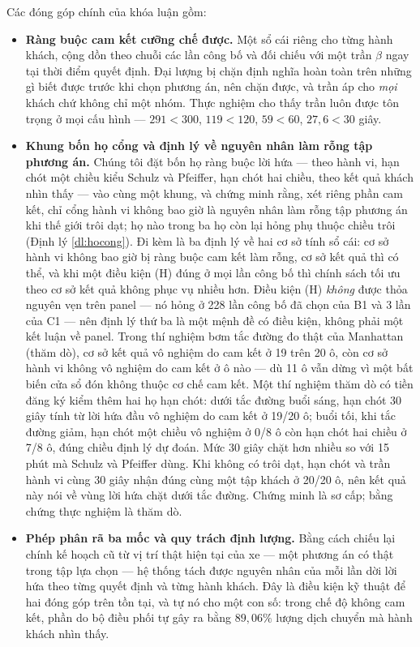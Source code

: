 Các đóng góp chính của khóa luận gồm:

\begin{itemize}[leftmargin=1.2cm,itemsep=3pt,topsep=4pt]
\item \textbf{Ràng buộc cam kết cưỡng chế được.} Một sổ cái riêng cho từng hành khách, cộng dồn
theo chuỗi các lần công bố và đối chiếu với một trần $\beta$ ngay tại thời điểm quyết định.
Đại lượng bị chặn định nghĩa hoàn toàn trên những gì biết được trước khi chọn phương án, nên chặn
được, và trần áp cho \emph{mọi} khách chứ không chỉ một nhóm. Thực nghiệm cho thấy trần luôn được
tôn trọng ở mọi cấu hình --- $291 < 300$, $119 < 120$, $59 < 60$, $27{,}6 < 30$ giây.

\item \textbf{Khung bốn họ cổng và định lý về nguyên nhân làm rỗng tập phương án.} Chúng tôi đặt
bốn họ ràng buộc lời hứa --- theo hành vi, hạn chót một chiều kiểu Schulz và Pfeiffer, hạn chót
hai chiều, theo kết quả khách nhìn thấy --- vào cùng một khung, và chứng minh rằng, xét riêng phần
cam kết, chỉ cổng hành vi không bao giờ là nguyên nhân làm rỗng tập phương án khi thế giới trôi
dạt; họ nào trong ba họ còn lại hỏng phụ thuộc chiều trôi (Định lý \ref{dl:hocong}). Đi kèm là ba
định lý về hai cơ sở tính sổ cái: cơ sở hành vi không bao giờ bị ràng buộc cam kết làm rỗng, cơ sở
kết quả thì có thể, và khi một điều kiện (H) đúng ở mọi lần công bố thì chính sách tối ưu theo cơ
sở kết quả không phục vụ nhiều hơn. Điều kiện (H) \emph{không} được thỏa nguyên vẹn trên panel ---
nó hỏng ở 228 lần công bố đã chọn của B1 và 3 lần của C1 --- nên định lý thứ ba là một mệnh đề có
điều kiện, không phải một kết luận về panel. Trong thí nghiệm bơm tắc đường đo thật của
Manhattan (thăm dò), cơ sở kết quả vô nghiệm do cam kết ở 19 trên 20 ô, còn cơ sở hành vi không
vô nghiệm do cam kết ở ô nào --- dù 11 ô vẫn dừng vì một bất biến cửa sổ đón không thuộc cơ chế cam
kết. Một thí nghiệm thăm dò có tiền đăng ký kiểm thêm hai họ hạn chót: dưới tắc đường buổi sáng, hạn
chót 30 giây tính từ lời hứa đầu vô nghiệm do cam kết ở 19/20 ô; buổi tối, khi tắc đường giảm, hạn
chót một chiều vô nghiệm ở 0/8 ô còn hạn chót hai chiều ở 7/8 ô, đúng chiều định lý dự đoán. Mức 30
giây chặt hơn nhiều so với 15 phút mà Schulz và Pfeiffer dùng. Khi không có trôi dạt, hạn chót và trần
hành vi cùng 30 giây nhận đúng cùng một tập khách ở 20/20 ô, nên kết quả này nói về vùng lời hứa chặt
dưới tắc đường. Chứng minh là sơ cấp; bằng chứng thực nghiệm là thăm dò.

\item \textbf{Phép phân rã ba mốc và quy trách định lượng.} Bằng cách chiếu lại chính kế hoạch
cũ từ vị trí thật hiện tại của xe --- một phương án có thật trong tập lựa chọn --- hệ thống tách
được nguyên nhân của mỗi lần dời lời hứa theo từng quyết định và từng hành khách. Đây là điều kiện
kỹ thuật để hai đóng góp trên tồn tại, và tự nó cho một con số: trong chế độ không cam kết, phần
do bộ điều phối tự gây ra bằng $89{,}06\%$ lượng dịch chuyển mà hành khách nhìn thấy.


\end{itemize}
